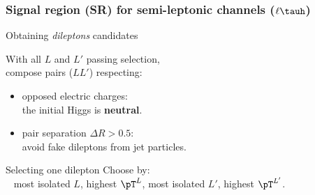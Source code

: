 \begin{frame}
\frametitle{Signal region (SR) for semi-leptonic channels ($\ell\tauh$)}

\begin{block}{Obtaining \emph{dileptons} candidates}
\begin{minipage}[c]{.55\linewidth}
With all $L$ and $L'$ passing selection,\\
compose  pairs ($LL'$) respecting:
\begin{itemize}
\item opposed electric charges:\\ the initial Higgs is \textbf{neutral}.
\item pair separation $\Delta R > \num{0.5}$:\\ avoid fake dileptons from jet particles.
\end{itemize}
\end{minipage}
\begin{minipage}[c]{.4\linewidth}

\end{minipage}
\end{block}
\pause
\begin{block}{Selecting one dilepton}
Choose by:\\
~\hfill
most isolated $L$,
\hfill
highest $\pT^L$,
\hfill
most isolated $L'$,
\hfill
highest $\pT^{L'}$.
\hfill~
\end{block}

\end{frame}


